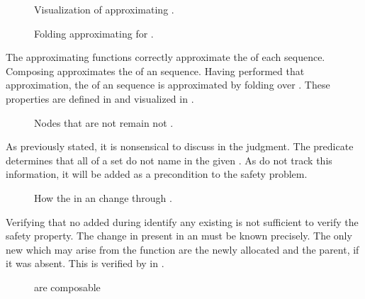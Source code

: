 \begin{figure}
  \FIGfullApproxCOQ{}
  \caption{Visualization of approximating \TMexecution{}. \label{fig:safety:approxExeVis}}
\end{figure}

\begin{figure}
  \COQDOCdirAccExecuteApprox{}
  \COQDOCpotAccExecuteApprox{}
  \caption{Folding approximating \TMops{} for \TMexecutions{}. \label{fig:safety:approxExe}}
\end{figure}

The approximating functions correctly approximate the \TMaccessGraphs{} of each \TMop{} sequence.
Composing \TMdirAccOps{} approximates the \TMdirAcc{} of an \TMop{} sequence.
Having performed that approximation, the \TMpotAcc{} of an \TMop{} sequence is approximated by folding over \COQpotAccOp{}.
These properties are defined in  and visualized in .

\begin{figure}
  \COQDOCnodesNotUnborn{}
  \COQDOCnodesNotUnbornOpList{}
  \caption{Nodes that are not \TMunborn{} remain not \TMunborn{}.}
\end{figure}

As previously stated, it is nonsensical to discuss \TMunborn{} \TMobjs{} in the \TMattenuating{} judgment.
The predicate \COQnodesNotUnborn{} determines that all \TMrefs{} of a set do not name \TMunborn{} \TMobjs{} in the given \TMsystemState{}.
As \TMaccessGraphs{} do not track this information, it will be added as a precondition to the safety problem.

\begin{figure}
  \COQDOCagNodesSpecEndow{}
  \caption{How the \TMobjs{} in an \TMaccessGraph{} change through \TMendowment{}.\label{fig:safety:agNodesSpecEndow}}
\end{figure}

Verifying that no \TMaccessEdges{} added during \TMendowment{} identify any existing \TMobjs{} is not sufficient to verify the safety property.
The change in \TMobjs{} present in an \TMaccessGraph{} must be known precisely.
The only new \TMobjs{} which may arise from the \TMendow{} function are the newly allocated \TMobj{} and the parent, if it was absent.
This is verified by \COQagNodesSpecEndow{} in .

\begin{figure}
  \COQDOCagReduceCompose{}
  \caption{\xmakefirstuc{\TMattenuations} are composable}
\end{figure}

